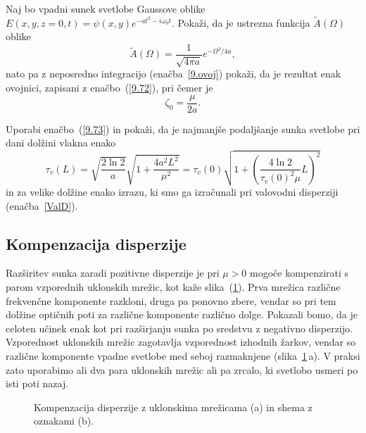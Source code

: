 \begin{definition}
\label{naloga:pulzdisperzija}
Naj bo vpadni sunek svetlobe Gaussove oblike $E(x,y, z=0, t) = 
\psi(x,y) e^{-at^2-i \omega_0 t}$. Pokaži, da je ustrezna funkcija $\tilde{A}(\Omega)$ oblike
\begin{equation}
\tilde{A}(\Omega) = \frac{1}{\sqrt{4 \pi a}}e^{-\Omega^2/4a},
\end{equation}
nato pa z neposredno integracijo (enačba~\ref{9.ovoj}) pokaži, 
da je rezultat enak ovojnici, zapisani z enačbo~(\ref{9.72}), pri čemer je
\begin{equation}
\zeta_0 = \frac{\mu}{2 a}.
\end{equation}
\end{definition}

\begin{definition}
Uporabi enačbo~(\ref{9.73}) in pokaži, da je najmanjše podaljšanje sunka svetlobe
pri dani dolžini vlakna enako
\begin{equation}
\tau_v (L) = \sqrt{\frac{2 \ln 2}{a}}\sqrt{1 + \frac{4 a^2 L^2}{\mu^2}}
= \tau_v(0)\sqrt{1 + \left(\frac{4 \ln 2}{\tau_v(0)^2 \mu}L\right)^2}
\end{equation}
in za velike dolžine enako izrazu, ki smo ga izračunali pri 
valovodni disperziji (enačba~\ref{ValD}).
\end{definition}

\subsection*{Kompenzacija disperzije}
Razširitev sunka zaradi pozitivne disperzije je pri $\mu > 0$ mogoče kompenzirati
s parom vzporednih uklonskih mrežic, kot kaže slika~(\ref{fig:comp}).
Prva mrežica različne frekvenčne komponente razkloni, druga pa ponovno
zbere, vendar so pri tem dolžine optičnih poti za različne komponente različno dolge.
Pokazali bomo, da je celoten učinek enak kot pri razširjanju sunka po sredstvu z negativno
disperzijo. Vzporednost uklonskih mrežic zagotavlja vzporednost izhodnih žarkov,
vendar so različne komponente vpadne svetlobe med seboj razmaknjene (slika~\ref{fig:comp}\,a).
V praksi zato uporabimo ali dva para uklonskih mrežic ali pa 
zrcalo, ki svetlobo usmeri po isti poti nazaj. 
\begin{figure}[h]
\centering
\def\svgwidth{120truemm} 

\caption{Kompenzacija disperzije z uklonskima mrežicama (a) in shema z
oznakami (b).}
\label{fig:comp}
\end{figure}

